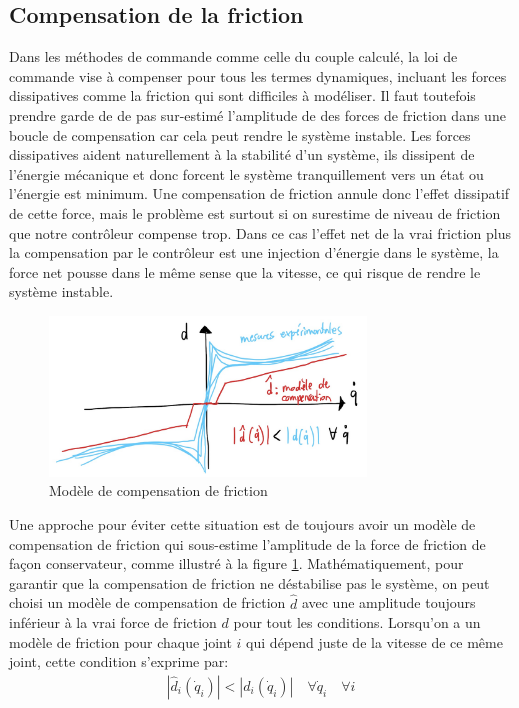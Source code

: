 \subsection{Compensation de la friction}

Dans les méthodes de commande comme celle du couple calculé, la loi de commande vise à compenser pour tous les termes dynamiques, incluant les forces dissipatives comme la friction qui sont difficiles à modéliser. Il faut toutefois prendre garde de de pas sur-estimé l'amplitude de des forces de friction dans une boucle de compensation car cela peut rendre le système instable. Les forces dissipatives aident naturellement à la stabilité d'un système, ils dissipent de l'énergie mécanique et donc forcent le système tranquillement vers un état ou l'énergie est minimum. Une compensation de friction annule donc l'effet dissipatif de cette force, mais le problème est surtout si on surestime de niveau de friction que notre contrôleur compense trop. Dans ce cas l'effet net de la vrai friction plus la compensation par le contrôleur est une injection d'énergie dans le système, la force net pousse dans le même sense que la vitesse, ce qui risque de rendre le système instable.

\begin{figure}[htp]
	\centering
		\includegraphics[width=0.75\textwidth]{fig/friction_compensation.jpg}
	\caption{Modèle de compensation de friction}
	\label{fig:friction_compensation}
\end{figure}

Une approche pour éviter cette situation est de toujours avoir un modèle de compensation de friction qui sous-estime l'amplitude de la force de friction de façon conservateur, comme illustré à la figure \ref{fig:friction_compensation}. Mathématiquement, pour garantir que la compensation de friction ne déstabilise pas le système, on peut choisi un modèle de compensation de friction $\hat{d}$ avec une amplitude toujours inférieur à la vrai force de friction $d$ pour tout les conditions. Lorsqu'on a un modèle de friction pour chaque joint $i$ qui dépend juste de la vitesse de ce même joint, cette condition s'exprime par:
\begin{align}
\left| \hat{d}_i(\dot{q}_i) \right| < \left| d_i(\dot{q}_i) \right| \quad \forall \dot{q}_i \quad \forall i
\end{align}

